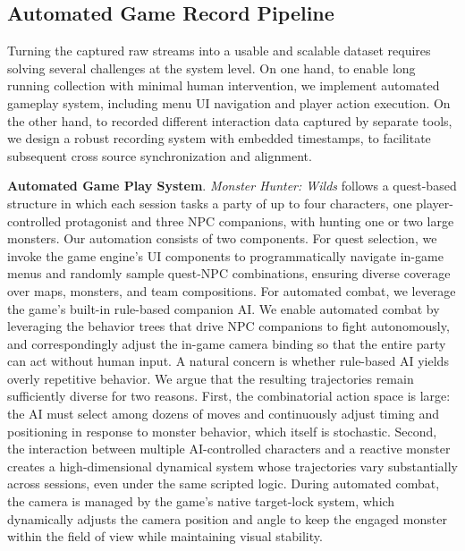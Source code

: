 \subsection{Automated Game Record Pipeline}

Turning the captured raw streams into a usable and scalable dataset requires solving several challenges at the system level. 
On one hand, to enable long running collection with minimal human intervention, we implement automated gameplay system, including menu UI navigation and player action execution.
On the other hand, to recorded different interaction data captured by separate tools, we design a robust recording system with embedded timestamps, to facilitate subsequent cross source synchronization and alignment.

\noindent
\textbf{Automated Game Play System}.
\textit{Monster Hunter: Wilds} follows a quest-based structure in which each session tasks a party of up to four characters, one player-controlled protagonist and three NPC companions, with hunting one or two large monsters.
Our automation consists of two components.
For quest selection, we invoke the game engine's UI components to programmatically navigate in-game menus and randomly sample quest-NPC combinations, ensuring diverse coverage over maps, monsters, and team compositions.
For automated combat, we leverage the game's built-in rule-based companion AI.
We enable automated combat by leveraging the behavior trees that drive NPC companions to fight autonomously, and correspondingly adjust the in-game camera binding so that the entire party can act without human input.
A natural concern is whether rule-based AI yields overly repetitive behavior.
We argue that the resulting trajectories remain sufficiently diverse for two reasons.
First, the combinatorial action space is large: the AI must select among dozens of moves and continuously adjust timing and positioning in response to monster behavior, which itself is stochastic.
Second, the interaction between multiple AI-controlled characters and a reactive monster creates a high-dimensional dynamical system whose trajectories vary substantially across sessions, even under the same scripted logic.
During automated combat, the camera is managed by the game's native target-lock system, which dynamically adjusts the camera position and angle to keep the engaged monster within the field of view while maintaining visual stability.

